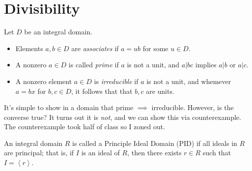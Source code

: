 \chapter{Divisibility}
\begin{definition}\label{dfn:3.1}
	Let $D$ be an integral domain. 
	\begin{itemize}
		\item Elements $a,b\in D$ are \emph{associates} if $a=ub$ for some $u\in D$.
		\item A nonzero $a\in D$ is called \emph{prime} if $a$ is not a unit, and $a|bc$ implies $a|b$ or $a|c$.
		\item A nonzero element $a\in D$ is \emph{irreducible} if $a$ is not a unit, and whemever $a=bx$ for $b,c\in D$, it follows that that $b,c$ are units.
	\end{itemize}
\end{definition}

It's simple to show in a domain that prime $\implies $ irreducible. However, is the converse true? It turns out it is \emph{not}, and we can show this via counterexample. The counterexample took half of class so I zoned out.
\begin{definition}[PID]\label{dfn:3.2}
	An integral domain $R$ is called a Principle Ideal Domain (PID) if all ideals in $R$ are principal; that is, if $I$ is an ideal of $R$, then there exists $r\in R$ such that $I=\left\langle r \right\rangle $.
\end{definition}

